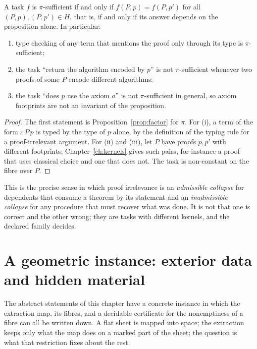 \begin{proposition}
\label{prop:pirrel}
A task $f$ is $\pi$-sufficient if and only if $f(P,p)=f(P,p')$ for all $(P,p),(P,p')\in H$, that is, if and only if its answer depends on the proposition alone. In particular:
\begin{enumerate}[label=(\roman*),nosep]
\item type checking of any term that mentions the proof only through its type is $\pi$-sufficient;
\item the task ``return the algorithm encoded by $p$'' is not $\pi$-sufficient whenever two proofs of some $P$ encode different algorithms;
\item the task ``does $p$ use the axiom $a$'' is not $\pi$-sufficient in general, so axiom footprints are not an invariant of the proposition.
\end{enumerate}
\end{proposition}

\begin{proof}
The first statement is Proposition~\ref{prop:factor} for $\pi$. For (i), a term of the form $c\,P\,p$ is typed by the type of $p$ alone, by the definition of the typing rule for a proof-irrelevant argument. For (ii) and (iii), let $P$ have proofs $p,p'$ with different footprints; Chapter~\ref{ch:kernels} gives such pairs, for instance a proof that uses classical choice and one that does not. The task is non-constant on the fibre over $P$.
\end{proof}

This is the precise sense in which proof irrelevance is an \emph{admissible collapse} for dependents that consume a theorem by its statement and an \emph{inadmissible collapse} for any procedure that must recover what was done. It is not that one is correct and the other wrong; they are tasks with different kernels, and the declared family decides.

\section{A geometric instance: exterior data and hidden material}
\label{sec:geometric}

The abstract statements of this chapter have a concrete instance in which the extraction map, its fibres, and a decidable certificate for the nonemptiness of a fibre can all be written down. A flat sheet is mapped into space; the extraction keeps only what the map does on a marked part of the sheet; the question is what that restriction fixes about the rest.

